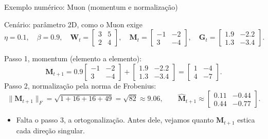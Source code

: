 \documentclass[aspectratio=169,xcolor=dvipsnames]{beamer}
\begin{document}
  \begin{frame}{Exemplo numérico: Muon (momentum e normalização)}
    \begin{block}{Cenário: parâmetro 2D, como o Muon exige}
      \[
        \eta=0.1,\quad \beta=0.9,\quad
        \mathbf{W}_t=\begin{bmatrix}3&5\\2&4\end{bmatrix},\quad
        \mathbf{M}_t=\begin{bmatrix}-1&-2\\3&-4\end{bmatrix},\quad
        \mathbf{G}_t=\begin{bmatrix}1.9&-2.2\\1.3&-3.4\end{bmatrix}.
      \]
    \end{block}
    Passo 1, momentum (elemento a elemento):
    \[
      \mathbf{M}_{t+1}=0.9\begin{bmatrix}-1&-2\\3&-4\end{bmatrix}+\begin{bmatrix}1.9&-2.2\\1.3&-3.4\end{bmatrix}
      =\begin{bmatrix}1&-4\\4&-7\end{bmatrix}.
    \]
    Passo 2, normalização pela norma de Frobenius:
    \[
      \|\mathbf{M}_{t+1}\|_{F}=\sqrt{1+16+16+49}=\sqrt{82}\approx 9.06,
      \qquad
      \widehat{\mathbf{M}}_{t+1}\approx\begin{bmatrix}0.11&-0.44\\0.44&-0.77\end{bmatrix}.
    \]
    \begin{itemize}
      \item Falta o passo 3, a ortogonalização. Antes dele, vejamos quanto $\mathbf{M}_{t+1}$ estica cada direção singular.
    \end{itemize}
  \end{frame}
\end{document}
